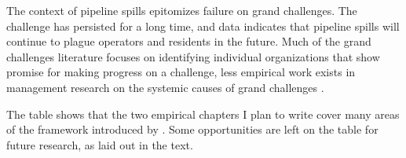 \documentclass{article}
\begin{document}
The context of pipeline spills epitomizes failure on grand challenges. The challenge has persisted for a long time, and data indicates that pipeline spills will continue to plague operators and residents in the future. Much of the grand challenges literature focuses on identifying individual organizations that show promise for making progress on a challenge, less empirical work exists in management research on the systemic causes of grand challenges \citep[the exception being][]{Wright2017}.

The table shows that the two empirical chapters I plan to write cover many areas of the framework introduced by \citet{George2015}. Some opportunities are left on the table for future research, as laid out in the text.



\end{document}
